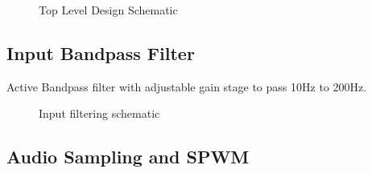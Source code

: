 \documentclass[11pt]{article}
\begin{document}
{\begin{figure}[h!]
  \centering
    \caption{Top Level Design Schematic}
\end{figure}

\subsection{Input Bandpass Filter}

Active Bandpass filter with adjustable gain stage to pass 10Hz to 200Hz.

\begin{figure}[h!]
  \centering
  \caption{Input filtering schematic}
\end{figure}

\subsection{Audio Sampling and SPWM}

}
\end{document}
